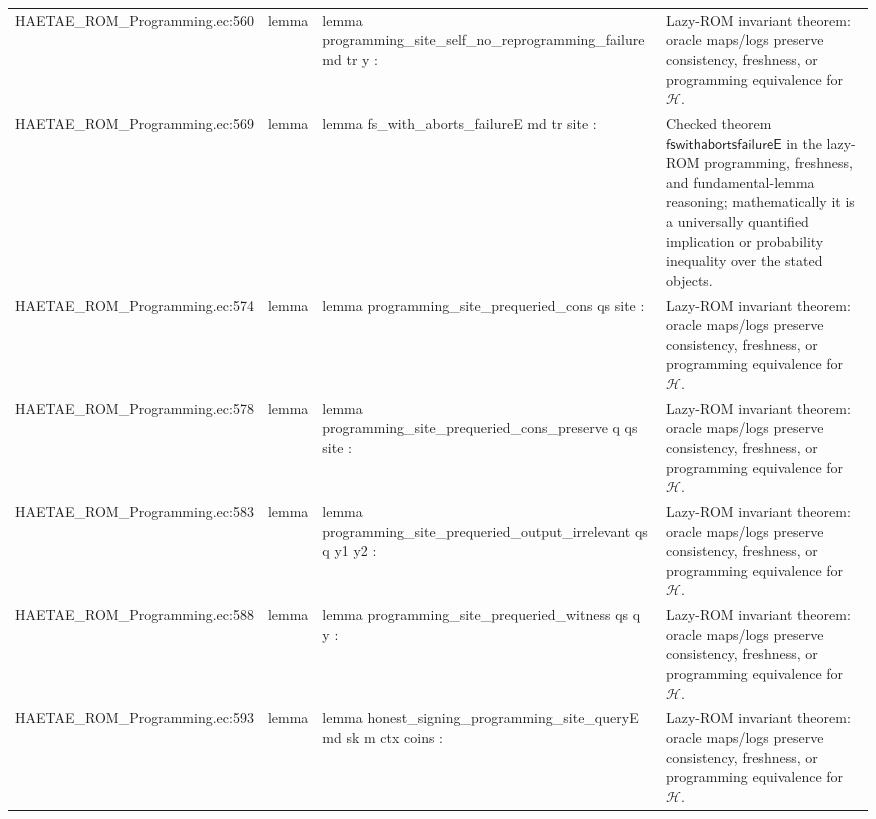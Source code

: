 \documentclass[10pt]{article}
\begin{document}
\begin{longtable}{L{0.11\textwidth}L{0.055\textwidth}L{0.385\textwidth}L{0.41\textwidth}}
HAETAE\_\allowbreak{}ROM\_\allowbreak{}Programming.\allowbreak{}ec:\allowbreak{}560 & lemma & {\ttfamily\scriptsize lemma programming\_\allowbreak{}site\_\allowbreak{}self\_\allowbreak{}no\_\allowbreak{}reprogramming\_\allowbreak{}failure md tr y :} & Lazy-ROM invariant theorem: oracle maps/logs preserve consistency, freshness, or programming equivalence for $\mathcal H$. \\
HAETAE\_\allowbreak{}ROM\_\allowbreak{}Programming.\allowbreak{}ec:\allowbreak{}569 & lemma & {\ttfamily\scriptsize lemma fs\_\allowbreak{}with\_\allowbreak{}aborts\_\allowbreak{}failureE md tr site :} & Checked theorem $\mathsf{fswithabortsfailureE}$ in the lazy-ROM programming, freshness, and fundamental-lemma reasoning; mathematically it is a universally quantified implication or probability inequality over the stated objects. \\
HAETAE\_\allowbreak{}ROM\_\allowbreak{}Programming.\allowbreak{}ec:\allowbreak{}574 & lemma & {\ttfamily\scriptsize lemma programming\_\allowbreak{}site\_\allowbreak{}prequeried\_\allowbreak{}cons qs site :} & Lazy-ROM invariant theorem: oracle maps/logs preserve consistency, freshness, or programming equivalence for $\mathcal H$. \\
HAETAE\_\allowbreak{}ROM\_\allowbreak{}Programming.\allowbreak{}ec:\allowbreak{}578 & lemma & {\ttfamily\scriptsize lemma programming\_\allowbreak{}site\_\allowbreak{}prequeried\_\allowbreak{}cons\_\allowbreak{}preserve q qs site :} & Lazy-ROM invariant theorem: oracle maps/logs preserve consistency, freshness, or programming equivalence for $\mathcal H$. \\
HAETAE\_\allowbreak{}ROM\_\allowbreak{}Programming.\allowbreak{}ec:\allowbreak{}583 & lemma & {\ttfamily\scriptsize lemma programming\_\allowbreak{}site\_\allowbreak{}prequeried\_\allowbreak{}output\_\allowbreak{}irrelevant qs q y1 y2 :} & Lazy-ROM invariant theorem: oracle maps/logs preserve consistency, freshness, or programming equivalence for $\mathcal H$. \\
HAETAE\_\allowbreak{}ROM\_\allowbreak{}Programming.\allowbreak{}ec:\allowbreak{}588 & lemma & {\ttfamily\scriptsize lemma programming\_\allowbreak{}site\_\allowbreak{}prequeried\_\allowbreak{}witness qs q y :} & Lazy-ROM invariant theorem: oracle maps/logs preserve consistency, freshness, or programming equivalence for $\mathcal H$. \\
HAETAE\_\allowbreak{}ROM\_\allowbreak{}Programming.\allowbreak{}ec:\allowbreak{}593 & lemma & {\ttfamily\scriptsize lemma honest\_\allowbreak{}signing\_\allowbreak{}programming\_\allowbreak{}site\_\allowbreak{}queryE md sk m ctx coins :} & Lazy-ROM invariant theorem: oracle maps/logs preserve consistency, freshness, or programming equivalence for $\mathcal H$. \\

\end{longtable}
\end{document}
